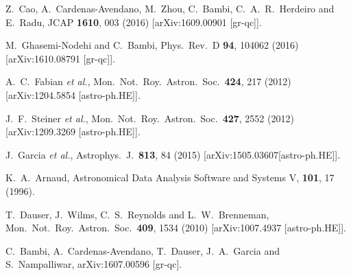 \documentclass[aps, prd, amsmath, floats, floatfix, twocolumn, nofootinbib, superscriptaddress, showpacs]{revtex4-1}
\begin{document}
\begin{thebibliography}{99}
  Z.~Cao, A.~Cardenas-Avendano, M.~Zhou, C.~Bambi, C.~A.~R.~Herdeiro and E.~Radu,
  JCAP {\bf 1610}, 003 (2016)
  [arXiv:1609.00901 [gr-qc]].  
  
  M.~Ghasemi-Nodehi and C.~Bambi,
  Phys.\ Rev.\ D {\bf 94}, 104062 (2016)
  [arXiv:1610.08791 [gr-qc]].  
  
  A.~C.~Fabian {\it et al.},
  Mon.\ Not.\ Roy.\ Astron.\ Soc.\  {\bf 424}, 217 (2012)
  [arXiv:1204.5854 [astro-ph.HE]].   
  
  J.~F.~Steiner {\it et al.},
  Mon.\ Not.\ Roy.\ Astron.\ Soc.\  {\bf 427}, 2552 (2012)
  [arXiv:1209.3269 [astro-ph.HE]].   
  
  J.~Garcia {\it et al.},
  Astrophys.\ J.\ {\bf 813}, 84 (2015)
  [arXiv:1505.03607[astro-ph.HE]].    
  
  K.~A.~Arnaud,
  Astronomical Data Analysis Software and Systems V, {\bf 101}, 17 (1996).  
  
  T.~Dauser, J.~Wilms, C.~S.~Reynolds and L.~W.~Brenneman,
  Mon.\ Not.\ Roy.\ Astron.\ Soc.\  {\bf 409}, 1534 (2010)
  [arXiv:1007.4937 [astro-ph.HE]].  
  
  C.~Bambi, A.~Cardenas-Avendano, T.~Dauser, J.~A.~Garcia and S.~Nampalliwar,
  arXiv:1607.00596 [gr-qc].  

\end{thebibliography}
\end{document}

